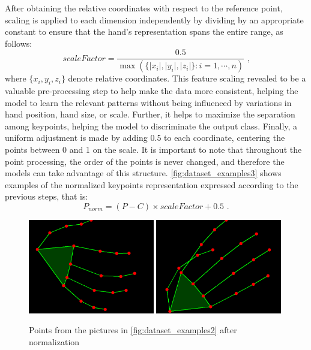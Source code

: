 After obtaining the relative coordinates with respect to the reference point, scaling is applied to each dimension independently by dividing by an appropriate constant to ensure that the hand’s representation spans the entire range, as follows:
\begin{equation}
scaleFactor = \frac {0.5}{\max(\{\lvert x_i \rvert,\lvert y_i \rvert,\lvert z_i\rvert\}: i=1,\cdots,n)} \text{  ,}
\end{equation}
%
where $\{x_i,y_i,z_i\}$ denote relative coordinates. This feature scaling revealed to be a valuable pre-processing step to help make the data more consistent, helping the model to learn the relevant patterns without being influenced by variations in hand position, hand size, or scale. Further, it helps to maximize the separation among keypoints, helping the model to discriminate the output class. Finally, a uniform adjustment is made by adding 0.5 to each coordinate, centering the points between 0 and 1 on the scale. It is important to note that throughout the point processing, the order of the points is never changed, and therefore the models can take advantage of this structure. \autoref{fig:dataset_examples3} shows examples of the normalized keypoints representation expressed according to the previous steps, that is: 
\begin{equation}
P_{norm} = (P - C) \times scaleFactor + 0.5\text{ .}
\end{equation}

\begin{figure}[ht]
    \centerline{\includegraphics[width=0.49\textwidth]{figs/dataset_preprocessing3_1.png} \includegraphics[width=0.49\textwidth]{figs/dataset_preprocessing3_2.png}}
    \caption{Points from the pictures in \autoref{fig:dataset_examples2} after normalization}
    \label{fig:dataset_examples3}
\end{figure}

